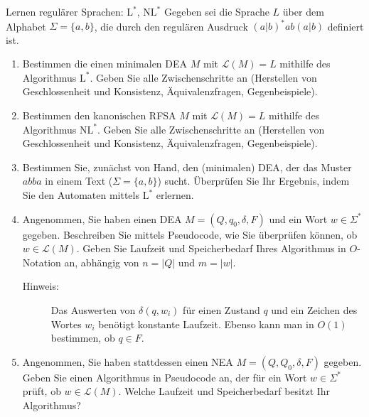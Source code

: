 \documentclass[11pt,a4paper]{article}
\begin{document}
\begin{aufgabe}{4}{Lernen regulärer Sprachen: $\mathrm{L}^*$, $\mathrm{NL}^*$}
    Gegeben sei die Sprache $L$ über dem Alphabet $\Sigma = \{a, b\}$, die durch den regulären Ausdruck $(a|b)^*ab(a|b)$ definiert ist.
    \begin{enumerate}
        \item Bestimmen die einen minimalen DEA $M$ mit $\mathcal{L}(M) = L$ mithilfe des Algorithmus $\mathrm{L}^*$. Geben Sie alle Zwischenschritte an (Herstellen von Geschlossenheit und Konsistenz, Äquivalenzfragen, Gegenbeispiele).
        \item Bestimmen den kanonischen RFSA $M$ mit $\mathcal{L}(M) = L$ mithilfe des Algorithmus $\mathrm{NL}^*$. Geben Sie alle Zwischenschritte an (Herstellen von Geschlossenheit und Konsistenz, Äquivalenzfragen, Gegenbeispiele).
        \item Bestimmen Sie, zunächst von Hand, den (minimalen) DEA, der das Muster $abba$ in einem Text ($\Sigma = \{a, b\}$) sucht.
        Überprüfen Sie Ihr Ergebnis, indem Sie den Automaten mittels $\mathrm{L}^*$ erlernen.
        \item Angenommen, Sie haben einen DEA $M = (Q, q_0, \delta, F)$ und ein Wort $w \in \Sigma^*$ gegeben.
        Beschreiben Sie mittels Pseudocode, wie Sie überprüfen können, ob $w \in \mathcal{L}(M)$. Geben Sie Laufzeit und Speicherbedarf Ihres Algorithmus in $O$-Notation an, abhängig von $n = |Q|$ und $m = |w|$.
        \begin{description}
            \item[Hinweis:] Das Auswerten von $\delta(q, w_i)$ für einen Zustand $q$ und ein Zeichen des Wortes $w_i$ benötigt konstante Laufzeit.
            Ebenso kann man in $O(1)$ bestimmen, ob $q \in F$.
        \end{description}
        \item Angenommen, Sie haben stattdessen einen NEA $M = (Q, Q_0, \delta, F)$ gegeben.
        Geben Sie einen Algorithmus in Pseudocode an, der für ein Wort $w \in \Sigma^*$ prüft, ob $w \in \mathcal{L}(M)$.
        Welche Laufzeit und Speicherbedarf besitzt Ihr Algorithmus?
    \end{enumerate}
\end{aufgabe}
\end{document}
